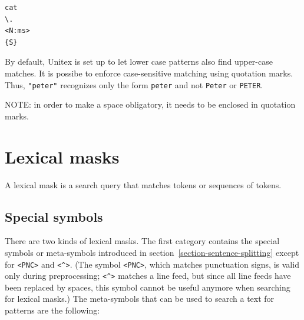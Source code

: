 \begin{verbatim}
cat
\.
<N:ms>
{S}
\end{verbatim}

\noindent By default, Unitex is set up to let lower case patterns also find
upper-case matches. It is possibe to enforce case-sensitive matching using quotation marks. Thus,
\verb+"peter"+ recognizes only the form \verb+peter+ and not \verb+Peter+
or \verb+PETER+.

\bigskip
\noindent NOTE: in order to make a space obligatory, it needs to  be  enclosed 
in quotation marks.


\section{Lexical masks}
A lexical mask is a search query that matches tokens or sequences of tokens.

\subsection{Special symbols}
\label{section-special-symbols}

There are two kinds of lexical masks. The first category contains the special symbols or meta-symbols 
introduced in section~\ref{section-sentence-splitting} except for \verb$<PNC>$ and \verb+<^>+.
(The symbol \verb$<PNC>$, which matches punctuation signs, is valid only
during preprocessing; \verb+<^>+ matches a line feed, but
since all line feeds have been replaced by spaces, this symbol cannot be
useful anymore when searching for lexical masks.) The meta-symbols that can be used to search a text for patterns are
the following:


